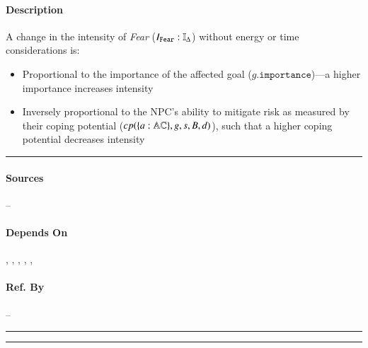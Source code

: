 \paragraph{Description} A change in the intensity of \textit{Fear} ($I_{\mathtt{Fear}}
: \mathbb{I}_{\Delta}$) without energy or time considerations is:
\begin{itemize}
    \item Proportional to the importance of the affected goal
    ($g.\mathtt{importance}$)---a higher importance increases intensity

    \item Inversely proportional to the NPC's ability to mitigate risk as
    measured by their coping potential ($cp(\{a : \mathbb{AC}\}, g, s, B, d)$),
    such that a higher coping potential decreases intensity
\end{itemize}
\hrule

\paragraph{Sources} --

\paragraph{Depends On} , , 
, , , 

\paragraph{Ref. By} -- \\\hrule\vspace{0.5mm}\hrule

~\newline

